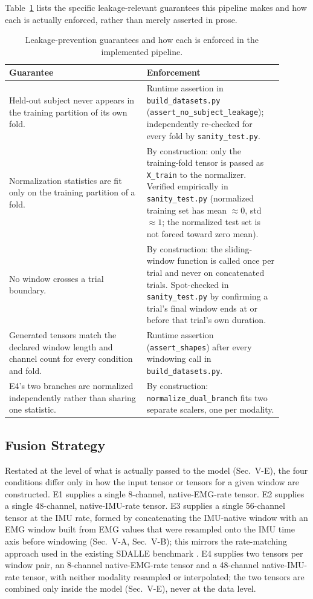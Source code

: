 \documentclass[conference]{IEEEtran}
\begin{document}
Table~\ref{tab:leakage-checklist} lists the specific leakage-relevant
guarantees this pipeline makes and how each is actually enforced,
rather than merely asserted in prose.

\begin{table}[t]
\centering
\caption{Leakage-prevention guarantees and how each is enforced in
the implemented pipeline.}
\label{tab:leakage-checklist}
\begin{tabular}{p{0.46\linewidth}p{0.44\linewidth}}
\toprule
Guarantee & Enforcement \\
\midrule
Held-out subject never appears in the training partition of its
own fold. &
Runtime assertion in \texttt{build\_datasets.py}
(\texttt{assert\_no\_subject\_leakage}); independently re-checked
for every fold by \texttt{sanity\_test.py}. \\[3pt]
Normalization statistics are fit only on the training partition of
a fold. &
By construction: only the training-fold tensor is passed as
\texttt{X\_train} to the normalizer. Verified empirically in
\texttt{sanity\_test.py} (normalized training set has mean
$\approx 0$, std $\approx 1$; the normalized test set is not
forced toward zero mean). \\[3pt]
No window crosses a trial boundary. &
By construction: the sliding-window function is called once per
trial and never on concatenated trials. Spot-checked in
\texttt{sanity\_test.py} by confirming a trial's final window ends
at or before that trial's own duration. \\[3pt]
Generated tensors match the declared window length and channel
count for every condition and fold. &
Runtime assertion (\texttt{assert\_shapes}) after every windowing
call in \texttt{build\_datasets.py}. \\[3pt]
E4's two branches are normalized independently rather than sharing
one statistic. &
By construction: \texttt{normalize\_dual\_branch} fits two separate
scalers, one per modality. \\
\bottomrule
\end{tabular}
\end{table}

\subsection{Fusion Strategy}
\label{subsec:fusion-strategy}

Restated at the level of what is actually passed to the model
(Sec.~V-E), the four conditions differ only in how the input tensor
or tensors for a given window are constructed. E1 supplies a single
8-channel, native-EMG-rate tensor. E2 supplies a single 48-channel,
native-IMU-rate tensor. E3 supplies a single 56-channel tensor at
the IMU rate, formed by concatenating the IMU-native window with an
EMG window built from EMG values that were resampled onto the IMU
time axis before windowing (Sec.~V-A, Sec.~V-B); this mirrors the
rate-matching approach used in the existing SDALLE benchmark
\cite{farouk2026sdalle}. E4 supplies two tensors per window pair, an
8-channel native-EMG-rate tensor and a 48-channel native-IMU-rate
tensor, with neither modality resampled or interpolated; the two
tensors are combined only inside the model (Sec.~V-E), never at the
data level.
\end{document}
